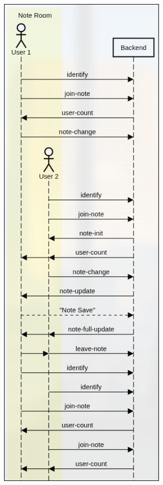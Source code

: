 \documentclass[11pt]{article}
\begin{document}
\begin{figure}[H]
    \centering
    \begin{minipage}[t]{0.23\textwidth}
        \vspace{0pt}
        \includegraphics[width=\linewidth]{./Resources/Diagrams/UML-NotaSequenze.png}

\end{minipage}
\end{figure}
\end{document}
